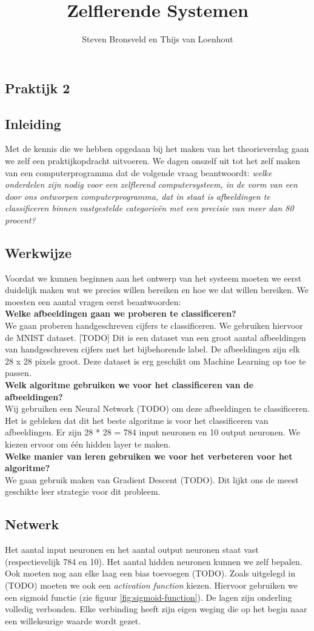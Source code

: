 \documentclass[a4paper,titlepage]{article}
\title{Zelflerende Systemen}
\author{Steven Bronsveld en Thijs van Loenhout}
\begin{document}
\textcolor{praktijk}{
	\section{Praktijk 2}
}


\subsection{Inleiding}
Met de kennis die we hebben opgedaan bij het maken van het theorieverslag gaan we zelf een praktijkopdracht uitvoeren. We dagen onszelf uit tot het zelf maken van een computerprogramma dat de volgende vraag beantwoordt: \textit{welke onderdelen zijn nodig voor een zelflerend computersysteem, in de vorm van een door ons ontworpen computerprogramma, dat in staat is afbeeldingen te classificeren binnen vastgestelde categorie\"en met een precisie van meer dan 80 procent?}

\subsection{Werkwijze}
Voordat we kunnen beginnen aan het ontwerp van het systeem moeten we eerst duidelijk maken wat we precies willen bereiken en hoe we dat willen bereiken. We moesten een aantal vragen eerst beantwoorden:\\
\textbf{Welke afbeeldingen gaan we proberen te classificeren?}\\
We gaan proberen handgeschreven cijfers te classificeren. We gebruiken hiervoor de MNIST dataset. [TODO] Dit is een dataset van een groot aantal afbeeldingen van handgeschreven cijfers met het bijbehorende label. De afbeeldingen zijn elk 28 x 28 pixels groot. Deze dataset is erg geschikt om Machine Learning op toe te passen.\\
\textbf{Welk algoritme gebruiken we voor het classificeren van de afbeeldingen?}\\
Wij gebruiken een Neural Network (TODO) om deze afbeeldingen te classificeren. Het is gebleken dat dit het beste algoritme is voor het classificeren van afbeeldingen. Er zijn 28 * 28 = 784 input neuronen en 10 output neuronen. We kiezen ervoor om één hidden layer te maken.\\
\textbf{Welke manier van leren gebruiken we voor het verbeteren voor het algoritme?}\\
We gaan gebruik maken van Gradient Descent (TODO). Dit lijkt ons de meest geschikte leer strategie voor dit probleem.

\subsection{Netwerk}
Het aantal input neuronen en het aantal output neuronen staat vast (respectievelijk 784 en 10). Het aantal hidden neuronen kunnen we zelf bepalen. Ook moeten nog aan elke laag een bias toevoegen (TODO). Zoals uitgelegd in (TODO) moeten we ook een \textit{activation function} kiezen. Hiervoor gebruiken we een sigmoid functie (zie figuur \ref{fig:sigmoid-function}). De lagen zijn onderling volledig verbonden. Elke verbinding heeft zijn eigen weging die op het begin naar een willekeurige waarde wordt gezet.
\end{document}
